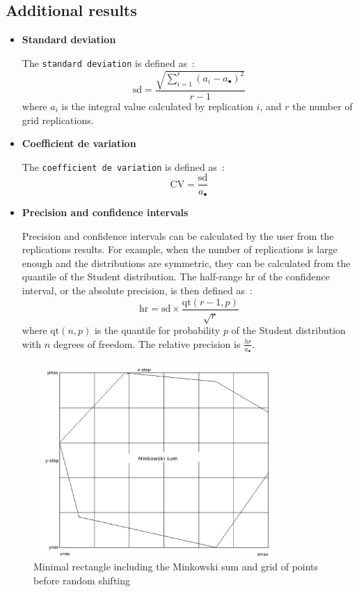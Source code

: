 \subsection{Additional results}
\begin{itemize}
\item
\textbf{Standard deviation}

The \texttt{standard deviation} is defined as~: 
\begin{equation}
\mathrm{sd} = \frac{ \sqrt{\sum_{i=1}^{r} (a_{i} - a_{\bullet})^2}} {
  r-1}
\end{equation}
where  $a_{i}$ is the integral value calculated by replication $i$,
and $r$ the number of grid replications.

\item\textbf{Coefficient de variation} 

The \texttt{coefficient de variation} is defined as~: 
\begin{equation}
\mathrm{CV} = \frac{\mathrm{sd}}{a_{\bullet}}
\end{equation}


\item
\textbf{Precision and confidence intervals}
\label{it:gridprec}

Precision and confidence intervals can be calculated by the user
from the replications results.
For example, when the number of replications is large enough and  the
distributions are symmetric, they can be calculated from the quantile
of the Student distribution.
The half-range $\mathrm{hr}$ of the confidence
interval, or the absolute precision, is then defined as~:
\begin{equation}
\mathrm{hr} =  \mathrm{sd} \times \frac{\mathrm{qt}(r-1, p)}{\sqrt{r}}
\end{equation}
where  $\mathrm{qt}(n,p)$ is the quantile for probability $p$ of the Student
distribution with $n$ degrees of freedom.
The relative precision is $\frac{hr}{a_{\bullet}}$.
\end{itemize}


\begin{figure}[htbp]
  \begin{center}
  \includegraphics[width=9cm]{VignetteDir/graphics/integrale.eps}
  \end{center}
  \caption{Minimal rectangle including the Minkowski sum and grid of
    points before random shifting}
  \label{integrale}
\end{figure}



